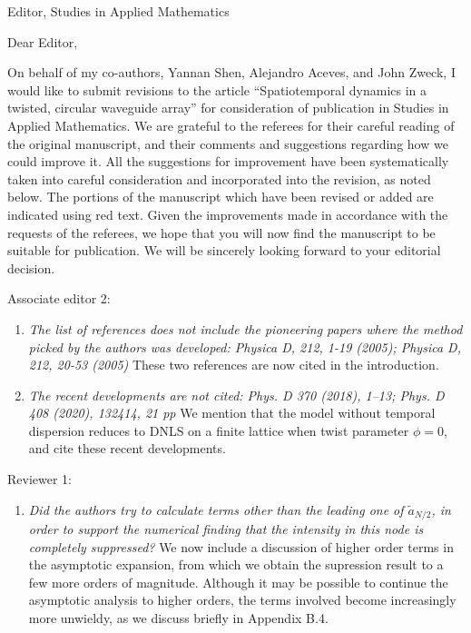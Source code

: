 \documentclass[11pt]{letter}
\begin{document}
\address{Ross Parker \\
Department of Mathematics \\
Southern Methodist University \\
Dallas, TX 75275 \\
\texttt{rhparker@smu.edu}}%
\signature{Ross Parker}
\begin{letter}{Editor, Studies in Applied Mathematics}

\opening{Dear Editor,}

On behalf of my co-authors, Yannan Shen, Alejandro Aceves, and John Zweck, I would like to submit revisions to the article ``Spatiotemporal dynamics in a twisted, circular waveguide array'' for consideration of publication in Studies in Applied Mathematics. We are grateful to the referees for their careful reading of the original manuscript, and their comments and suggestions regarding how we could improve it. All the suggestions for improvement have been systematically taken into careful consideration and incorporated into the revision, as noted below. The portions of the manuscript which have been revised or added are indicated using red text. Given the improvements made in accordance with the requests of the referees, we hope that you will now find the manuscript to be suitable for publication. We will be sincerely looking forward to your editorial decision.

Associate editor 2:
\begin{enumerate}
    \item \emph{The list of references does not include the pioneering papers where the method picked by the authors was developed: Physica D, 212, 1-19 (2005); Physica D, 212, 20-53 (2005)} These two references are now cited in the introduction.
    \vspace{4mm}

    \item \emph{The recent developments are not cited: Phys. D 370 (2018), 1–13;  Phys. D 408 (2020), 132414, 21 pp} We mention that the model without temporal dispersion reduces to DNLS on a finite lattice when twist parameter $\phi = 0$, and cite these recent developments.
    \vspace{4mm}
\end{enumerate}

Reviewer 1:
\begin{enumerate}
    \item \emph{Did the authors try to calculate terms other than the leading one of $\tilde{a}_{N/2}$, in order to support the numerical finding that the intensity in this node is completely suppressed?} We now include a discussion of higher order terms in the asymptotic expansion, from which we obtain the supression result to a few more orders of magnitude. Although it may be possible to continue the asymptotic analysis to higher orders, the terms involved become increasingly more unwieldy, as we discuss briefly in Appendix B.4.
    \vspace{4mm}


\end{enumerate}
\end{letter}
\end{document}
